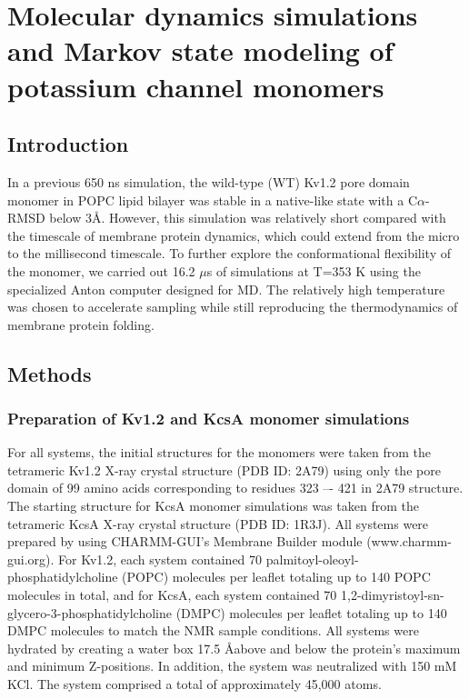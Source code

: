 
\chapter{Molecular dynamics simulations and Markov state modeling of potassium channel monomers}

\section{Introduction}
In a previous 650 ns simulation, the wild-type (WT) Kv1.2 pore domain monomer in POPC lipid bilayer was stable in a native-like state with a C$\alpha$-RMSD below 3\AA. \cite{gajewski2011} However, this simulation was relatively short compared with the timescale of membrane protein dynamics, which could extend from the micro to the millisecond timescale. \cite{booth1995} To further explore the conformational flexibility of the monomer, we carried out 16.2 $\mu$s of simulations at T=353 K using the specialized Anton computer designed for MD. \cite{shaw2009} The relatively high temperature was chosen to accelerate sampling while still reproducing the thermodynamics of membrane protein folding. \cite{ulmschneider2014}

\section{Methods}

\subsection{Preparation of Kv1.2 and KcsA monomer simulations}
For all systems, the initial structures for the monomers were taken from the tetrameric Kv1.2 X-ray crystal structure (PDB ID: 2A79) using only the pore domain of 99 amino acids corresponding to residues 323 –- 421 in 2A79 structure. \cite{long2005} The starting structure for KcsA monomer simulations was taken from the tetrameric KcsA X-ray crystal structure (PDB ID: 1R3J). \cite{zhou2003} All systems were prepared by using CHARMM-GUI’s Membrane Builder module (www.charmm-gui.org). \cite{jo2007, jo2008, jo2009, lee2016, wu2014} For Kv1.2, each system contained 70 palmitoyl-oleoyl-phosphatidylcholine (POPC) molecules per leaflet totaling up to 140 POPC molecules in total, and for KcsA, each system contained 70 1,2-dimyristoyl-sn-glycero-3-phosphatidylcholine (DMPC) molecules per leaflet totaling up to 140 DMPC molecules to match the NMR sample conditions. All systems were hydrated by creating a water box 17.5 \AA above and below the protein’s maximum and minimum Z-positions. In addition, the system was neutralized with 150 mM KCl. The system comprised a total of approximately 45,000 atoms.

